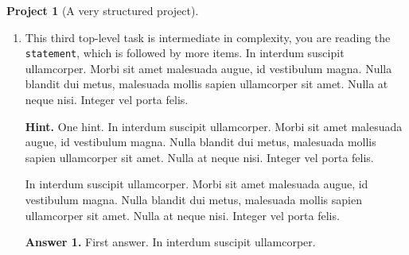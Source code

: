 \documentclass[10pt,]{article}
\theoremstyle{plain}
\theoremstyle{definition}
\theoremstyle{definition}
\theoremstyle{definition}
\theoremstyle{definition}
\newtheorem{project}{Project}[section]
\theoremstyle{definition}
\theoremstyle{definition}
\numberwithin{equation}{section}
\begin{document}
\begin{project}[A very structured project]
\begin{enumerate}[font=\bfseries,label=(\alph*),ref=\alph*]
\begin{enumerate}[font=\bfseries,label=(\roman*),ref=\theenumi.\roman*]
\begin{enumerate}[font=\bfseries,label=(\Alph*),ref=\theenumi.\theenumii.\Alph*]
\hypertarget{p-96}{}%
In interdum suscipit ullamcorper%
\par
\hypertarget{p-97}{}%
In interdum suscipit ullamcorper. Morbi sit amet malesuada augue, id vestibulum magna. Nulla blandit dui metus, malesuada mollis sapien ullamcorper sit amet. Nulla at neque nisi. Integer vel porta felis.%
\end{enumerate}
\bigbreak
\hypertarget{p-98}{}%
The conclusion of the structured subtask.  In interdum suscipit ullamcorper. Morbi sit amet malesuada augue, id vestibulum magna. Nulla blandit dui metus, malesuada mollis sapien ullamcorper sit amet. Nulla at neque nisi. Integer vel porta felis.%
\item\label{task-10} \hypertarget{p-99}{}%
A simple task as the last subtask.  In interdum suscipit ullamcorper. Morbi sit amet malesuada augue, id vestibulum magna. Nulla blandit dui metus, malesuada mollis sapien ullamcorper sit amet. Nulla at neque nisi. Integer vel porta felis.%
\end{enumerate}
\bigbreak
\hypertarget{p-100}{}%
This concludes our structured second task.  In interdum suscipit ullamcorper. Morbi sit amet malesuada augue, id vestibulum magna. Nulla blandit dui metus, malesuada mollis sapien ullamcorper sit amet. Nulla at neque nisi. Integer vel porta felis.%
\item\label{task-11} \hypertarget{p-101}{}%
This third top-level task is intermediate in complexity, you are reading the \lstinline?statement?, which is followed by more items. In interdum suscipit ullamcorper. Morbi sit amet malesuada augue, id vestibulum magna. Nulla blandit dui metus, malesuada mollis sapien ullamcorper sit amet. Nulla at neque nisi. Integer vel porta felis.%
\par\smallskip%
\noindent\textbf{Hint.}\hypertarget{hint-4}{}\quad%
\hypertarget{p-102}{}%
One hint.  In interdum suscipit ullamcorper. Morbi sit amet malesuada augue, id vestibulum magna. Nulla blandit dui metus, malesuada mollis sapien ullamcorper sit amet. Nulla at neque nisi. Integer vel porta felis.%
\par
\hypertarget{p-103}{}%
In interdum suscipit ullamcorper. Morbi sit amet malesuada augue, id vestibulum magna. Nulla blandit dui metus, malesuada mollis sapien ullamcorper sit amet. Nulla at neque nisi. Integer vel porta felis.%
\par\smallskip%
\noindent\textbf{Answer 1.}\hypertarget{answer-5}{}\quad%
\hypertarget{p-104}{}%
First answer.  In interdum suscipit ullamcorper.%
\par\smallskip%

\end{enumerate}
\end{project}
\end{document}
